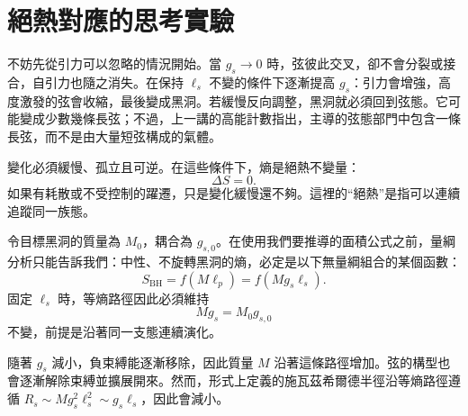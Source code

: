\section{絕熱對應的思考實驗}

不妨先從引力可以忽略的情況開始。當 \(g_s\to0\) 時，弦彼此交叉，卻不會分裂或接合，自引力也隨之消失。在保持 \(\ell_s\) 不變的條件下逐漸提高 \(g_s\)：引力會增強，高度激發的弦會收縮，最後變成黑洞。若緩慢反向調整，黑洞就必須回到弦態。它可能變成少數幾條長弦；不過，上一講的高能計數指出，主導的弦態部門中包含一條長弦，而不是由大量短弦構成的氣體。

\begin{classroomqa}
\end{classroomqa}

變化必須緩慢、孤立且可逆。在這些條件下，熵是絕熱不變量：
\begin{equation}
\Delta S=0.
\label{eq:l07-adiabatic}
\end{equation}
如果有耗散或不受控制的躍遷，只是變化緩慢還不夠。這裡的``絕熱''是指可以連續追蹤同一族態。

令目標黑洞的質量為 \(M_0\)，耦合為 \(g_{s,0}\)。在使用我們要推導的面積公式之前，量綱分析只能告訴我們：中性、不旋轉黑洞的熵，必定是以下無量綱組合的某個函數：
\begin{equation}
S_{\mathrm{BH}}=f(M\ell_p)
=f(Mg_s\ell_s).
\label{eq:l07-entropy-function}
\end{equation}
固定 \(\ell_s\) 時，等熵路徑因此必須維持
\begin{equation}
Mg_s=M_0g_{s,0}
\label{eq:l07-adiabat}
\end{equation}
不變，前提是沿著同一支態連續演化。

隨著 \(g_s\) 減小，負束縛能逐漸移除，因此質量 \(M\) 沿著這條路徑增加。弦的構型也會逐漸解除束縛並擴展開來。然而，形式上定義的施瓦茲希爾德半徑沿等熵路徑遵循 \(R_s\sim Mg_s^2\ell_s^2\sim g_s\ell_s\)，因此會減小。

\begin{classroomqa}
\end{classroomqa}


